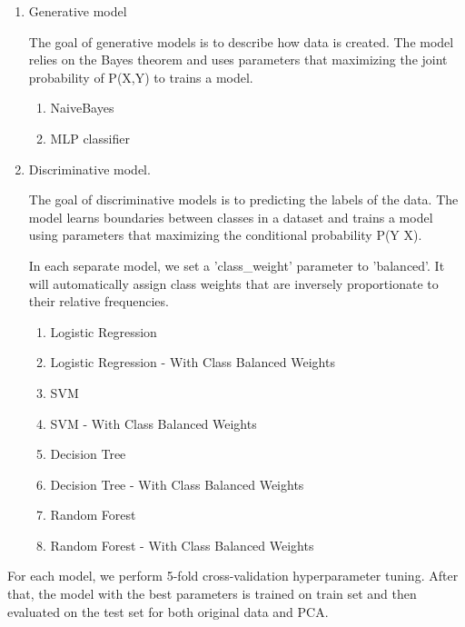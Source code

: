 \begin{enumerate}
    \item Generative model 
    
    The goal of generative models is to describe how data is created. The model relies on the Bayes theorem and uses parameters that maximizing the joint probability of P(X,Y) to trains a model.
    
    \begin{enumerate}
        \item NaiveBayes
        \item MLP classifier
    \end{enumerate}
    
    \item Discriminative model.
    
    The goal of discriminative models is to predicting the labels of the data. The model learns boundaries between classes in a dataset and trains a model using parameters that maximizing the conditional probability P(Y \textbar X).
    
    In each separate model, we set a 'class\_weight' parameter to 'balanced'. It will automatically assign class weights that are inversely proportionate to their relative frequencies.
    
    \begin{enumerate}
        \item Logistic Regression
        \item Logistic Regression - With Class Balanced Weights
        \item SVM
        \item SVM - With Class Balanced Weights
        \item Decision Tree
        \item Decision Tree - With Class Balanced Weights
        \item Random Forest
        \item Random Forest - With Class Balanced Weights
    \end{enumerate}
\end{enumerate}

For each model, we perform 5-fold cross-validation hyperparameter tuning. After that, the model with the best parameters is trained on train set and then evaluated on the test set for both original data and PCA.

